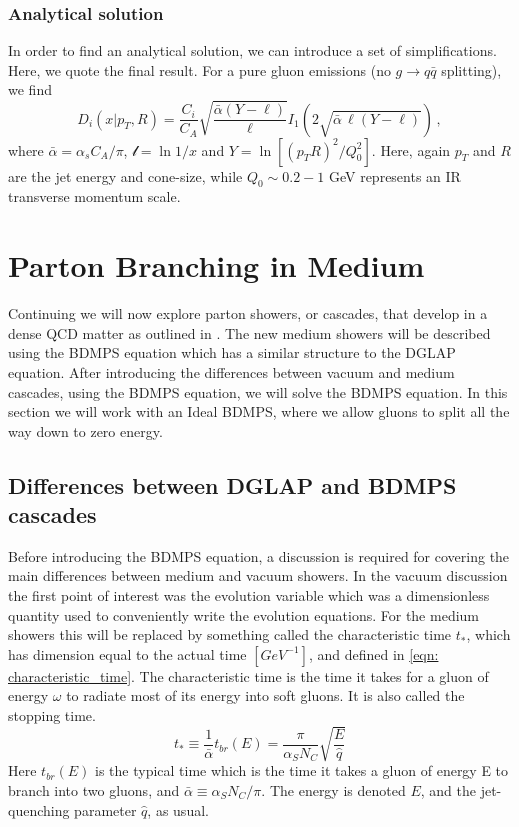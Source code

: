 \documentclass[main.tex]{subfiles}
\begin{document}
\subsubsection{Analytical solution}
In order to find an analytical solution, we can introduce a set of simplifications. 
Here, we quote the final result. For a pure gluon emissions (no $g\to q \bar q$ splitting), we find
\begin{equation}
    D_i(x|p_T,R) = \frac{C_i}{C_A}\sqrt{\frac{\bar\alpha (Y - \ell)}{\ell}} I_1 \left( 2 \sqrt{\bar \alpha \,\ell (Y- \ell)} \right) \,,
\end{equation}
where \(\bar \alpha =\alpha_s C_A/\pi\), \(\mathcal{l} = \ln 1/x\) and \(Y= \ln[ (p_T R)^2/Q_0^2]\). Here, again \(p_T\) and \(R\)
 are the jet energy and cone-size, while \(Q_0 \sim 0.2-1\) GeV represents an IR transverse momentum scale.

\newpage
\section{Parton Branching in Medium}
Continuing we will now explore parton showers, or cascades, that develop in a dense QCD matter as outlined in \cite{Energy_flow_medium_cascade_2016}. The new medium showers will be described using the BDMPS equation which has a similar structure to the DGLAP equation. After introducing the differences between vacuum and medium cascades, using the BDMPS equation, we will solve the BDMPS equation. In this section we will work with an Ideal BDMPS, where we allow gluons to split all the way down to zero energy.

\subsection{Differences between DGLAP and BDMPS cascades}
Before introducing the BDMPS equation, a discussion is required for covering the main differences between medium and vacuum showers. In the vacuum discussion the first point of interest was the evolution variable which was a dimensionless quantity used to conveniently write the evolution equations. For the medium showers this will be replaced by something called the characteristic time \(t_*\), which has dimension equal to the actual time \([GeV^{-1}]\), and defined in \autoref{eqn: characteristic_time}. The characteristic time is the time it takes for a gluon of energy \(\omega\) to radiate most of its energy into soft gluons. It is also called the stopping time.
\begin{equation}\label{eqn: characteristic_time}
    t_* \equiv \frac{1}{\bar \alpha} t_{br}(E) = \frac{\pi}{\alpha_S N_C} \sqrt{\frac{E}{\hat q}}
\end{equation}
Here \(t_{br}(E)\) is the typical time which is the time it takes a gluon of energy E to branch into two gluons, and \(\bar \alpha \equiv \alpha_S N_C / \pi\). The energy is denoted \(E\), and the jet-quenching parameter \(\hat q\), as usual.
\end{document}
